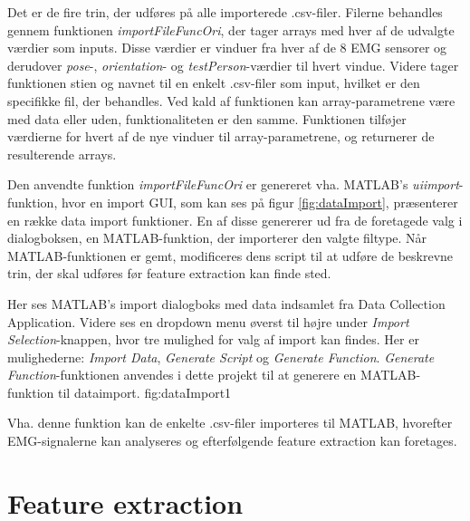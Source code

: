 Det er de fire trin, der udføres på alle importerede .csv-filer. Filerne behandles gennem funktionen \textit{importFileFuncOri}, der tager arrays med hver af de udvalgte værdier som inputs. Disse værdier er vinduer fra hver af de 8 EMG sensorer og derudover \textit{pose}-, \textit{orientation}- og \textit{testPerson}-værdier til hvert vindue. Videre tager funktionen stien og navnet til en enkelt .csv-filer som input, hvilket er den specifikke fil, der behandles. Ved kald af funktionen kan array-parametrene være med data eller uden, funktionaliteten er den samme. Funktionen tilføjer værdierne for hvert af de nye vinduer til array-parametrene, og returnerer de resulterende arrays. 

Den anvendte funktion \textit{importFileFuncOri} er genereret vha. MATLAB's \textit{uiimport}-funktion\citep{matlabUiimport}, hvor en import GUI, som kan ses på figur \ref{fig:dataImport}, præsenterer en række data import funktioner. En af disse genererer ud fra de foretagede valg i dialogboksen, en MATLAB-funktion, der importerer den valgte filtype. Når MATLAB-funktionen er gemt, modificeres dens script til at udføre de beskrevne trin, der skal udføres før feature extraction kan finde sted.

{
	Her ses MATLAB's import dialogboks med data indsamlet fra Data Collection Application. Videre ses en dropdown menu øverst til højre under \textit{Import Selection}-knappen, hvor tre mulighed for valg af import kan findes. Her er mulighederne: \textit{Import Data}, \textit{Generate Script} og \textit{Generate Function}. \textit{Generate Function}-funktionen anvendes i dette projekt til at generere en MATLAB-funktion til dataimport.
 }{fig:dataImport}{1}

Vha. denne funktion kan de enkelte .csv-filer importeres til MATLAB, hvorefter EMG-signalerne kan analyseres og efterfølgende feature extraction kan foretages.

\section{Feature extraction}

